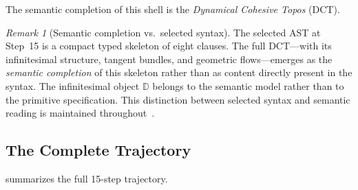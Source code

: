 \documentclass[11pt,a4paper]{article}
\theoremstyle{plain}
\theoremstyle{definition}
\theoremstyle{remark}
\newtheorem{remark}[theorem]{Remark}
\newcommand{\D}{\mathbb{D}}
\begin{document}
The semantic completion of this shell is the \emph{Dynamical Cohesive Topos} (DCT).

\begin{remark}[Semantic completion vs.\ selected syntax]
The selected AST at Step~15 is a compact typed skeleton of eight clauses.  The full DCT---with its infinitesimal structure, tangent bundles, and geometric flows---emerges as the \emph{semantic completion} of this skeleton rather than as content directly present in the syntax.  The infinitesimal object $\D$ belongs to the semantic model rather than to the primitive specification.  This distinction between selected syntax and semantic reading is maintained throughout~\cite{pen2026}.
\end{remark}


\subsection{The Complete Trajectory}

 summarizes the full 15-step trajectory.
\end{document}
